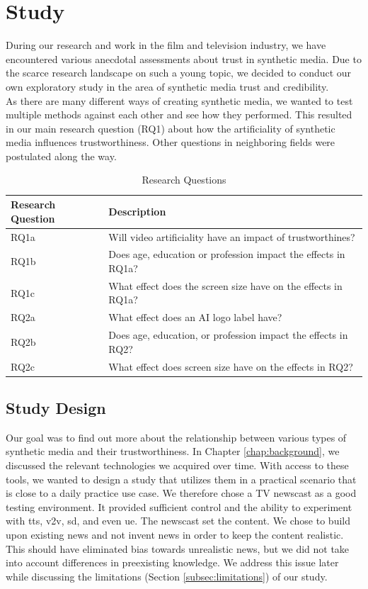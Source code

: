 \documentclass[
  a4paper,  %
  twoside,  %
  bibliography=totoc,
  headsepline,
  cleardoublepage=empty,
  parskip=half,
  draft=false
]{scrbook}
\begin{document}
\chapter{Study}
\label{chap:study}

During our research and work in the film and television industry, we have encountered various anecdotal assessments about trust in synthetic media. Due to the scarce research landscape on such a young topic, we decided to conduct our own exploratory study in the area of synthetic media trust and credibility. \\
As there are many different ways of creating synthetic media, we wanted to test multiple methods against each other and see how they performed. This resulted in our main research question (RQ1) about how the artificiality of synthetic media influences trustworthiness. Other questions in neighboring fields were postulated along the way.

\begin{table}[h]
  \centering
  \begin{tabularx}{\textwidth}{l|X}
    \textbf{Research Question} & \textbf{Description}\\
    \midrule
    RQ1a & Will video artificiality have an impact of trustworthines?  \\
    \midrule
    RQ1b & Does age, education or profession impact the effects in RQ1a?  \\
    \midrule
    RQ1c & What effect does the screen size have on the effects in RQ1a?  \\
    \midrule
    RQ2a & What effect does an AI logo label have?\\
    \midrule
    RQ2b & Does age, education, or profession impact the effects in RQ2?  \\
    \midrule
    RQ2c & What effect does screen size have on the effects in RQ2?  \\
  \end{tabularx}
  \caption{Research Questions}
  \label{tab:research-questions}
\end{table}

\section{Study Design}
\label{sec:study design}

Our goal was to find out more about the relationship between various types of synthetic media and their trustworthiness. In Chapter \ref{chap:background}, we discussed the relevant technologies we acquired over time. With access to these tools, we wanted to design a study that utilizes them in a practical scenario that is close to a daily practice use case. We therefore chose a TV newscast as a good testing environment. It provided sufficient control and the ability to experiment with \gls{tts}, \gls{v2v}, \gls{sd}, and even \gls{ue}. The newscast set the content. We chose to build upon existing news and not invent news in order to keep the content realistic. This should have eliminated bias towards unrealistic news, but we did not take into account differences in preexisting knowledge. We address this issue later while discussing the limitations (Section \ref{subsec:limitations}) of our study.
\end{document}
